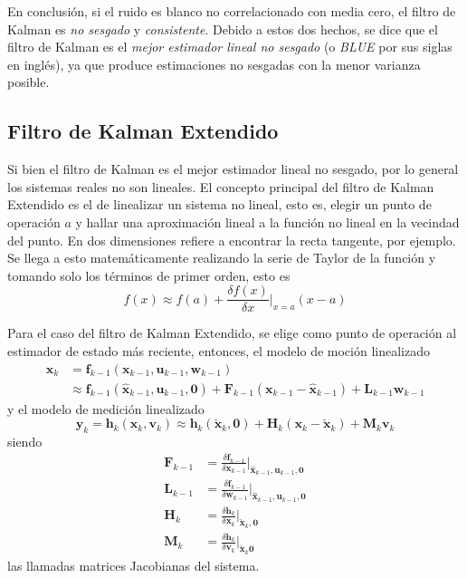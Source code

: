 En conclusión, si el ruido es blanco no correlacionado con media cero, el filtro de Kalman es \textit{no sesgado} y \textit{consistente}. Debido a estos dos hechos, se dice que el filtro de Kalman es el \textit{mejor estimador lineal no sesgado} (o \textit{BLUE} por sus siglas en inglés), ya que produce estimaciones no sesgadas con la menor varianza posible.

\subsection{Filtro de Kalman Extendido}
Si bien el filtro de Kalman es el mejor estimador lineal no sesgado, por lo general los sistemas reales no son lineales. El concepto principal del filtro de Kalman Extendido es el de linealizar un sistema no lineal, esto es, elegir un punto de operación $a$ y hallar una aproximación lineal a la función no lineal en la vecindad del punto. En dos dimensiones refiere a encontrar la recta tangente, por ejemplo. Se llega a esto matemáticamente realizando la serie de Taylor de la función y tomando solo los términos de primer orden, esto es
\begin{equation}
    f(x)\approx f(a) + \frac{\delta f(x)}{\delta x}\bigg\rvert_{x=a}(x-a)
\end{equation}

Para el caso del filtro de Kalman Extendido, se elige como punto de operación al estimador de estado más reciente, entonces, el modelo de moción linealizado
\begin{equation}
    \begin{aligned}
        \bm{x}_k &= \bm{f}_{k-1}(\bm{x}_{k-1},\bm{u}_{k-1},\bm{w}_{k-1})\\
        &\approx \bm{f}_{k-1}(\hat{\bm{x}}_{k-1},\bm{u}_{k-1},\bm{0}) + \bm{F}_{k-1}\left(\bm{x}_{k-1} - \hat{\bm{x}}_{k-1}\right) + \bm{L}_{k-1}\bm{w}_{k-1}
    \end{aligned}
\end{equation}
y el modelo de medición linealizado
\begin{equation}
    \bm{y}_k = \bm{h}_k(\bm{x}_k,\bm{v}_k)\approx \bm{h}_k(\check{\bm{x}}_k,\bm{0}) + \bm{H}_k(\bm{x}_k - \check{\bm{x}}_k) + \bm{M}_k \bm{v}_k
\end{equation}
siendo
\begin{align}
    \bm{F}_{k-1} &= \frac{\delta \bm{f}_{k-1}}{\delta \bm{x}_{k-1}}\bigg\rvert_{\hat{\bm{x}}_{k-1},\bm{u}_{k-1},\bm{0}} \\
    \bm{L}_{k-1} &= \frac{\delta \bm{f}_{k-1}}{\delta \bm{w}_{k-1}}\bigg\rvert_{\hat{\bm{x}}_{k-1},\bm{u}_{k-1},\bm{0}} \\
    \bm{H}_k &= \frac{\delta \bm{h}_k}{\delta \bm{x}_k}\bigg\rvert_{\check{\bm{x}}_{k},\bm{0}} \\
    \bm{M}_k &= \frac{\delta \bm{h}_k}{\delta \bm{v}_k}\bigg\rvert_{\check{\bm{x}}_{k}\bm{0}}
\end{align}
las llamadas matrices Jacobianas del sistema.

